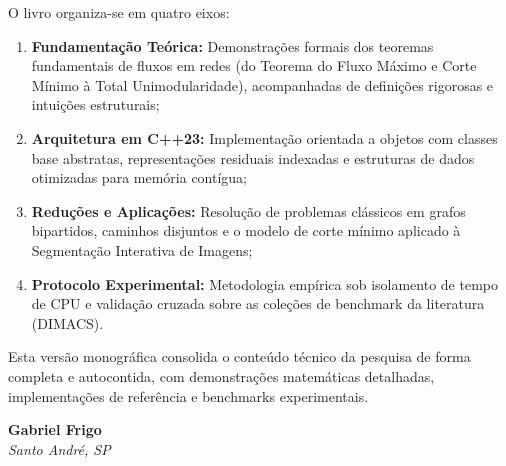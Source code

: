 O livro organiza-se em quatro eixos:
\begin{enumerate}[leftmargin=1.5em, itemsep=0.4em]
    \item \textbf{Fundamentação Teórica:} Demonstrações formais dos teoremas fundamentais de fluxos em redes (do Teorema do Fluxo Máximo e Corte Mínimo à Total Unimodularidade), acompanhadas de definições rigorosas e intuições estruturais;
    \item \textbf{Arquitetura em C++23:} Implementação orientada a objetos com classes base abstratas, representações residuais indexadas e estruturas de dados otimizadas para memória contígua;
    \item \textbf{Reduções e Aplicações:} Resolução de problemas clássicos em grafos bipartidos, caminhos disjuntos e o modelo de corte mínimo aplicado à Segmentação Interativa de Imagens;
    \item \textbf{Protocolo Experimental:} Metodologia empírica sob isolamento de tempo de CPU e validação cruzada sobre as coleções de benchmark da literatura (DIMACS).
\end{enumerate}

Esta versão monográfica consolida o conteúdo técnico da pesquisa de forma completa e autocontida, com demonstrações matemáticas detalhadas, implementações de referência e benchmarks experimentais.

\vspace{1cm}
\begin{flushright}
    \textbf{Gabriel Frigo}\\
    \textit{Santo André, SP}
\end{flushright}

\newpage
\tableofcontents
\newpage

